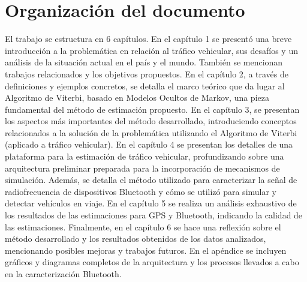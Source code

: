 \section{Organización del documento}
\label{sec:documento}

El trabajo se estructura en 6 capítulos. En el capítulo 1 se presentó una breve introducción a la problemática en relación al tráfico vehicular, sus desafíos y un análisis de la situación actual en el país y el mundo. También se mencionan trabajos relacionados y los objetivos propuestos. En el capítulo 2, a través de definiciones y ejemplos concretos, se detalla el marco teórico que da lugar al Algoritmo de Viterbi, basado en Modelos Ocultos de Markov, una pieza fundamental del método de estimación propuesto. En el capítulo 3, se presentan los aspectos más importantes del método desarrollado, introduciendo conceptos relacionados a la solución de la problemática utilizando el Algoritmo de Viterbi (aplicado a tráfico vehicular). En el capítulo 4 se presentan los detalles de una plataforma para la estimación de tráfico vehicular, profundizando sobre una arquitectura preliminar preparada para la incorporación de mecanismos de simulación. Además, se detalla el método utilizado para caracterizar la señal de radiofrecuencia de dispositivos Bluetooth y cómo se utilizó para simular y detectar vehículos en viaje. En el capítulo 5 se realiza un análisis exhaustivo de los resultados de las estimaciones para GPS y Bluetooth, indicando la calidad de las estimaciones. Finalmente, en el capítulo 6 se hace una reflexión sobre el método desarrollado y los resultados obtenidos de los datos analizados, mencionando posibles mejoras y trabajos futuros. En el apéndice se incluyen gráficos y diagramas completos de la arquitectura y los procesos llevados a cabo en la caracterización Bluetooth.
